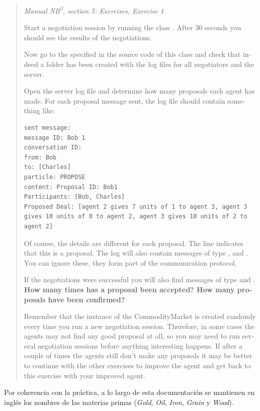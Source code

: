 \begin{otherlanguage}{english}
\begin{quote}
  \textit{Manual NB\textsuperscript{3}, section 5: Exercises, Exercise 1}

  Start a negotiation session by running the class . After 30 seconds
  you should see the results of the negotiations.

  Now go to the  specified in the source code of this class and check that
  indeed a folder has been created with the log files for all negotiators and the server.

  Open the server log file and determine how many proposals each agent has made. For each proposal
  message sent, the log file should contain something like:

\begin{lstlisting}
sent message:
message ID: Bob 1
conversation ID:
from: Bob
to: [Charles]
particle: PROPOSE
content: Proposal ID: Bob1
Participants: [Bob, Charles]
Proposed Deal: [agent 2 gives 7 units of 1 to agent 3, agent 3 gives 10 units of 0 to agent 2, agent 3 gives 10 units of 2 to agent 2]
\end{lstlisting}

  Of course, the details are different for each proposal. The line 
  indicates that this is a proposal. The log will also contain messages of type ,
   and . You can ignore these, they form part of the communication protocol.

  If the negotiations were successful you will also find messages of type  and
  . \textbf{How many times has a proposal been accepted? How many proposals have been
  confirmed?}

  Remember that the instance of the CommodityMarket is created randomly every time you run a new
  negotiation session. Therefore, in some cases the agents may not find any good proposal at all, so
  you may need to run several negotiation sessions before anything interesting happens. If after a
  couple of times the agents still don't make any proposals it may be better to continue with the
  other exercises to improve the agent and get back to this exercise with your improved agent.
\end{quote}
\end{otherlanguage}

Por coherencia con la práctica, a lo largo de esta documentación se mantienen en inglés los nombres
de las materias primas (\emph{Gold}, \emph{Oil}, \emph{Iron}, \emph{Grain} y \emph{Wood}).


